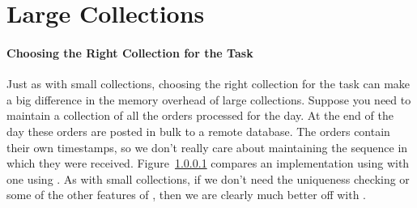 





\section{Large Collections}
\label{sec:large-collections}

\paragraph{Choosing the Right Collection for the Task} Just as with small
collections, choosing the right collection for the task can make a big difference
in the memory overhead of large collections.  Suppose
you need to maintain a collection of all the orders processed for the day.  At
the end of the day these orders are posted in bulk to a remote database. The orders
contain their own timestamps, so we don't really care about maintaining the
sequence in which they were received. Figure~\ref{} compares an implementation
using  with one using . As with small
collections, if we don't need the uniqueness checking or some of the
other features of , then we are clearly much better off with .

